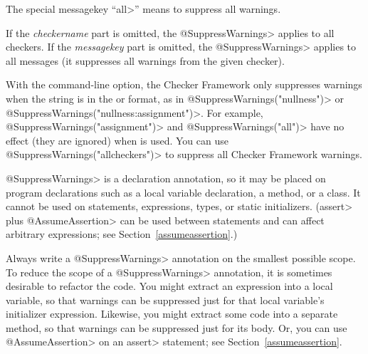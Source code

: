 The special messagekey ``\<all>'' means to suppress all warnings.

If the \emph{checkername} part is omitted, the \<@SuppressWarnings> applies
to all checkers.
If the \emph{messagekey} part is omitted, the \<@SuppressWarnings> applies
to all messages (it suppresses all warnings from the given checker).

With the  command-line
option, the Checker Framework only suppresses warnings when the string is in
the  or 
format, as in
\<@SuppressWarnings("nullness")> or
\<@SuppressWarnings("nullness:assignment")>.
For example, \<@SuppressWarnings("assignment")> and
\<@SuppressWarnings("all")> have no effect (they are ignored) when
 is used.  You can use
\<@SuppressWarnings("allcheckers")> to suppress all Checker Framework
warnings.

%



\<@SuppressWarnings> is a declaration annotation, so it may be placed on
program declarations such as a local variable declaration, a method, or a
class.  It cannot be used on statements, expressions, types, or static initializers.
(\<assert> plus \<@AssumeAssertion> can be used between statements and can
affect arbitrary expressions; see Section~\ref{assumeassertion}.)

Always write a \<@SuppressWarnings> annotation on the smallest possible
scope.  To reduce the scope of a \<@SuppressWarnings> annotation, it is
sometimes desirable to refactor the code.  You might extract an expression
into a local variable, so that warnings can be suppressed just for that
local variable's initializer expression.  Likewise, you might extract some
code into a separate method, so that warnings can be suppressed just for
its body.  Or, you can use \<@AssumeAssertion> on an \<assert> statement;
see Section~\ref{assumeassertion}.

